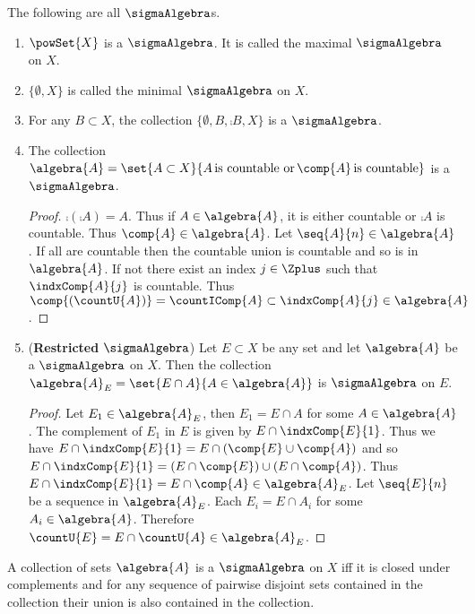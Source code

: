 \begin{Example}\label{ex:type_of_sigma_alg}
    The following are all $\sigmaAlgebra$s.
    \begin{enumerate}
	\item $\powSet{X}$ is a $\sigmaAlgebra$. It is called the maximal $\sigmaAlgebra$ on $X$.
	\item $\lbrace \emptyset, X \rbrace$ is called the minimal $\sigmaAlgebra$ on
	    $X$.
	\item For any $B \subset X$, the collection $\lbrace \emptyset, B, \comp{B}, X\rbrace$ is a
	    $\sigmaAlgebra$.
	\item The collection $\algebra{A} = \set{A \subset X}{A \, \text{is countable or} \,
	       	\comp{A}\,\text{is countable}}$ is a $\sigmaAlgebra$.
	    \begin{proof}
		$\comp{(\comp{A})} = A$. Thus if $A \in \algebra{A}$, it is either countable or
		$\comp{A}$ is countable. Thus $\comp{A} \in \algebra{A}$. Let $\seq{A}{n} \in
		\algebra{A}$. If all are countable then the countable union is countable and so is
		in $\algebra{A}$. If not there exist an index $j \in \Zplus$ such that
		$\indxComp{A}{j}$ is countable. Thus $\comp{(\countU{A})} = \countIComp{A} \subset
		\indxComp{A}{j} \in \algebra{A}$.
	    \end{proof}
	\item (\textbf{Restricted} $\sigmaAlgebra$)
	    Let $E \subset X$ be any set and let $\algebra{A}$ be a $\sigmaAlgebra$ on $X$. Then
	    the collection $\algebra{A}_{E} = \set{E \cap A}{A \in \algebra{A}}$ is $\sigmaAlgebra$
	    on $E$.
	    \begin{proof}
		Let $E_1 \in \algebra{A}_{E}$, then $E_1 = E \cap A$ for some $A \in \algebra{A}$.
		The complement of $E_1$ in $E$ is given by $E \cap \indxComp{E}{1}$. Thus we have $E
		\cap \indxComp{E}{1} = E \cap (\comp{E} \cup \comp{A})$ and so $E \cap \indxComp{E}{1} =
		(E \cap \comp{E}) \cup (E \cap \comp{A})$. Thus $E \cap \indxComp{E}{1} = E \cap
		\comp{A} \in \algebra{A}_{E}$. Let $\seq{E}{n}$ be a sequence in $\algebra{A}_{E}$.
		Each $E_i = E \cap A_i$ for some $A_i \in \algebra{A}$. Therefore $\countU{E} =
		E \cap \countU{A} \in \algebra{A}_{E}$.
	    \end{proof}
    \end{enumerate}
\end{Example}
\begin{Theorem}[name=Equivalent Characterization of $\sigmaAlgebra$]\label{thm:eq_ch_sigmaA}
    A collection of sets $\algebra{A}$ is a $\sigmaAlgebra$ on $X$ iff it is closed under
    complements and for any sequence of pairwise disjoint sets contained in the collection 
    their union is also contained in the collection. 
\end{Theorem}
